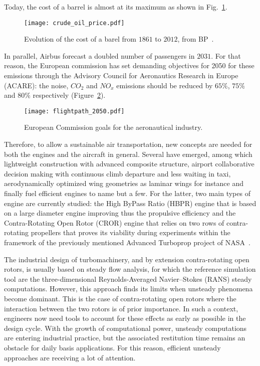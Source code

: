 Today, the cost of a barrel is almost at its maximum as shown
in Fig.~\ref{fig:crude_oil_price}.
\begin{figure}[htp]
  \centering
  \texttt{[image: crude\_oil\_price.pdf]}
  \caption{Evolution of the cost of a barel from $1861$ to $2012$, from BP~\cite{bpreview2013}.}
  \label{fig:crude_oil_price}
\end{figure}
In parallel, Airbus forecast a doubled number of passengers in
$2031$. For that reason, the European commission has set
demanding objectives for 2050 for these emissions
through the
Advisory Council for 
Aeronautics Research in Europe (ACARE):
the noise, $CO_2$ and $NO_x$ emissions should be reduced by 
$65\%$, $75\%$ and $80\%$ respectively
(Figure~\ref{fig:flightpath_2050}).
\begin{figure}[htp]
  \centering
  \texttt{[image: flightpath\_2050.pdf]}
  \caption{European Commission goals for the aeronautical industry.}
  \label{fig:flightpath_2050}
\end{figure}
Therefore, to allow a sustainable air transportation, new
concepts are needed for both the engines and the 
aircraft in general.
Several have emerged, among which lightweight construction
with advanced composite structure, airport collaborative decision
making with continuous climb departure and less waiting in taxi,
aerodynamically optimized wing geometries as laminar wings for instance
and finally fuel efficient engines to name but a few.
For the latter, two main types of engine are currently studied: the
High ByPass Ratio (HBPR) engine that is based on a
large diameter engine improving thus the
propulsive efficiency and the Contra-Rotating Open Rotor (CROR)
engine that relies on two rows of contra-rotating propellers
that proves its viability during experiments within the framework of
the previously mentioned Advanced Turboprop project of NASA~\cite{Hager1988}.

The industrial design of turbomachinery, and by extension contra-rotating
open rotors, is usually based on steady flow analysis, 
for which the reference simulation tool are the three-dimensio\-nal Reynolds-Averaged 
Navier--Stokes (RANS) steady computations. However, this approach finds its limits 
when unsteady phenomena become dominant. This is the case of 
contra-rotating open rotors where the interaction between the
two rotors is of prior importance. 
In such a
context, engineers now need tools to account for these effects as
early as possible in the design cycle. With the growth of
computational power, unsteady computations are entering industrial
practice, but the associated restitution time remains an obstacle for
daily basis applications.  For this reason, efficient
unsteady approaches are receiving a lot of attention. 

